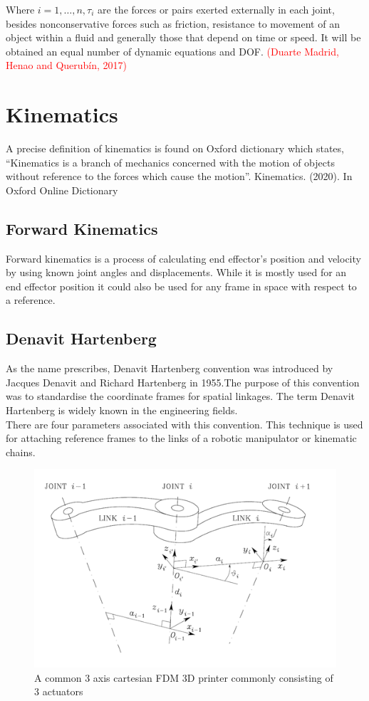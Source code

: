 \documentclass{UoNMCHA}
\numberwithin{equation}{section}
\begin{document}
Where $i=1,\ldots,n,\tau_i$ are the forces or pairs exerted externally in each joint, besides nonconservative forces such as friction, resistance to movement of an object within a fluid and generally those that depend on time or speed. It will be obtained an equal number of dynamic equations and DOF. \textcolor{red}{(Duarte Madrid, Henao and Querubín, 2017)}

\section{Kinematics}

A precise definition of kinematics is found on Oxford dictionary which states, “Kinematics is a branch of mechanics concerned with the motion of objects without reference to the forces which cause the motion”. Kinematics. (2020). In Oxford Online Dictionary 

\subsection{Forward Kinematics}

Forward kinematics is a process of calculating end effector’s position and velocity by using known joint angles and displacements. While it is mostly used for an end effector position it could also be used for any frame in space with respect to a reference.

\subsection*{Denavit Hartenberg}
As the name prescribes, Denavit Hartenberg convention was introduced by Jacques Denavit and Richard Hartenberg in 1955.The purpose of this convention was to standardise the coordinate frames for spatial linkages. The term Denavit Hartenberg is widely known in the engineering fields. \\

There are four parameters associated with this convention. This technique is used for attaching reference frames to the links of a robotic manipulator or kinematic chains.

\begin{figure}[H]
	\begin{center}
		\includegraphics[width=.5\linewidth]{figs/Picture2}
		\caption{A  common 3 axis cartesian FDM 3D printer commonly consisting of 3 actuators}
		\label{figs/Picture2}
	\end{center}
\end{figure}
\end{document}
